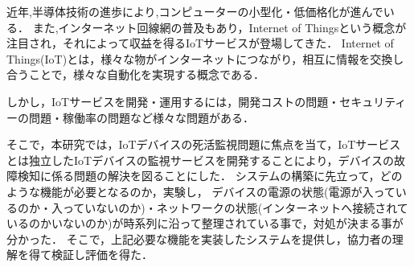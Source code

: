 近年,半導体技術の進歩により,コンピューターの小型化・低価格化が進んでいる．
また,インターネット回線網の普及もあり，Internet of Thingsという概念が注目され，それによって収益を得るIoTサービスが登場してきた．
Internet of Things(IoT)とは，様々な物がインターネットにつながり，相互に情報を交換し合うことで，様々な自動化を実現する概念である．

しかし，IoTサービスを開発・運用するには，開発コストの問題・セキュリティーの問題・稼働率の問題など様々な問題がある．

そこで，本研究では，IoTデバイスの死活監視問題に焦点を当て，IoTサービスとは独立したIoTデバイスの監視サービスを開発することにより，デバイスの故障検知に係る問題の解決を図ることにした．
システムの構築に先立って，どのような機能が必要となるのか，実験し，
デバイスの電源の状態(電源が入っているのか・入っていないのか)・ネットワークの状態(インターネットへ接続されているのかいないのか)が時系列に沿って整理されている事で，対処が決まる事が分かった．
そこで，上記必要な機能を実装したシステムを提供し，協力者の理解を得て検証し評価を得た．




